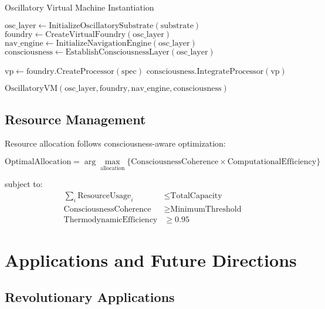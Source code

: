 \documentclass[12pt,a4paper]{article}
\begin{document}
\begin{algorithm}
\caption{Oscillatory Virtual Machine Instantiation}
\begin{algorithmic}[1]
    \State $\text{osc\_layer} \leftarrow \text{InitializeOscillatorySubstrate}(\text{substrate})$
    \State $\text{foundry} \leftarrow \text{CreateVirtualFoundry}(\text{osc\_layer})$
    \State $\text{nav\_engine} \leftarrow \text{InitializeNavigationEngine}(\text{osc\_layer})$
    \State $\text{consciousness} \leftarrow \text{EstablishConsciousnessLayer}(\text{osc\_layer})$
    
        \State $\text{vp} \leftarrow \text{foundry.CreateProcessor}(\text{spec})$
        \State $\text{consciousness.IntegrateProcessor}(\text{vp})$
    \EndFor
    
    \State \Return $\text{OscillatoryVM}(\text{osc\_layer}, \text{foundry}, \text{nav\_engine}, \text{consciousness})$
\EndProcedure
\end{algorithmic}
\end{algorithm}

\subsection{Resource Management}

Resource allocation follows consciousness-aware optimization:

\begin{equation}
\text{OptimalAllocation} = \arg\max_{\text{allocation}} \{\text{ConsciousnessCoherence} \times \text{ComputationalEfficiency}\}
\end{equation}

subject to:
\begin{align}
\sum_i \text{ResourceUsage}_i &\leq \text{TotalCapacity} \\
\text{ConsciousnessCoherence} &\geq \text{MinimumThreshold} \\
\text{ThermodynamicEfficiency} &\geq 0.95
\end{align}

\section{Applications and Future Directions}

\subsection{Revolutionary Applications}
\end{document}

